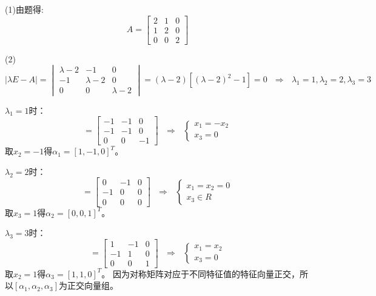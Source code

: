 \documentclass{article}
\begin{document}
\begin{jie}
(1)由题得:
\begin{equation*}
A=
\begin{bmatrix}
  2 & 1 & 0 \\
  1  & 2 & 0\\
  0 & 0 & 2
\end{bmatrix}
\end{equation*}

(2)
\begin{equation*}
|\lambda E-A|=
\begin{vmatrix}
  \lambda-2 & -1 & 0 \\
  -1  & \lambda-2 & 0\\
  0 & 0 & \lambda-2
\end{vmatrix}=(\lambda-2)[(\lambda-2)^2-1]=0~~~\Rightarrow ~~~\lambda_1=1,\lambda_2=2,\lambda_3=3
\end{equation*}

$\lambda_1=1$时：
\begin{equation*}
[\lambda E-A]=
\begin{bmatrix}
  -1 & -1 & 0 \\
  -1  & -1 & 0\\
  0 & 0 & -1
\end{bmatrix}~~~\Rightarrow~~~
\begin{cases}
 x_1=-x_2\\
 x_3=0
\end{cases}
\end{equation*}
取$x_2=-1$得$\alpha_1=[1,-1,0]^T$。

$\lambda_2=2$时：
\begin{equation*}
[\lambda E-A]=
\begin{bmatrix}
  0 & -1 & 0 \\
  -1  & 0 & 0\\
  0 & 0 & 0
\end{bmatrix}~~~\Rightarrow~~~
\begin{cases}
 x_1=x_2=0\\
 x_3\in R
\end{cases}
\end{equation*}
取$x_3=1$得$\alpha_2=[0,0,1]^T$。

$\lambda_3=3$时：
\begin{equation*}
[\lambda E-A]=
\begin{bmatrix}
  1 & -1 & 0 \\
  -1  & 1 & 0\\
  0 & 0 & 1
\end{bmatrix}~~~\Rightarrow~~~
\begin{cases}
 x_1=x_2\\
 x_3=0
\end{cases}
\end{equation*}
取$x_2=1$得$\alpha_3=[1,1,0]^T$。
因为对称矩阵对应于不同特征值的特征向量正交，所以$[\alpha_1,\alpha_2,\alpha_3]$为正交向量组。


\end{jie}
\end{document}
